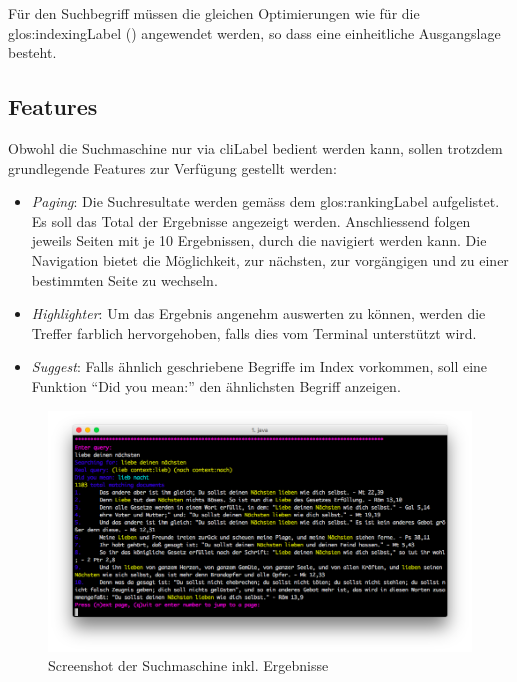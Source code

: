 Für den Suchbegriff müssen die gleichen Optimierungen wie für die \gls{glos:indexingLabel} () angewendet werden, so dass eine einheitliche Ausgangslage besteht.

\subsection{Features}
Obwohl die Suchmaschine nur via \gls{cliLabel} bedient werden kann, sollen trotzdem grundlegende Features zur Verfügung gestellt werden:
\begin{itemize}[noitemsep]
	\item \textit{Paging}:
	Die Suchresultate werden gemäss dem \gls{glos:rankingLabel} aufgelistet. Es soll das Total der Ergebnisse angezeigt werden. Anschliessend folgen jeweils Seiten mit je 10 Ergebnissen, durch die navigiert werden kann.
	Die Navigation bietet die Möglichkeit, zur nächsten, zur vorgängigen und zu einer bestimmten Seite zu wechseln.
	
	\item \textit{Highlighter}:
	Um das Ergebnis angenehm auswerten zu können, werden die Treffer farblich hervorgehoben, falls dies vom Terminal unterstützt wird.

	\item \textit{Suggest}:
	Falls ähnlich geschriebene Begriffe im Index vorkommen, soll eine Funktion "`Did you mean:"' den ähnlichsten Begriff anzeigen.
	
\end{itemize}

\vfill
\begin{figure}[H]
	\centering
	\includegraphics[width=1.0\textwidth]{images/3-realization/searching_screenshot.png}
	\caption{Screenshot der Suchmaschine inkl. Ergebnisse}
\end{figure}

